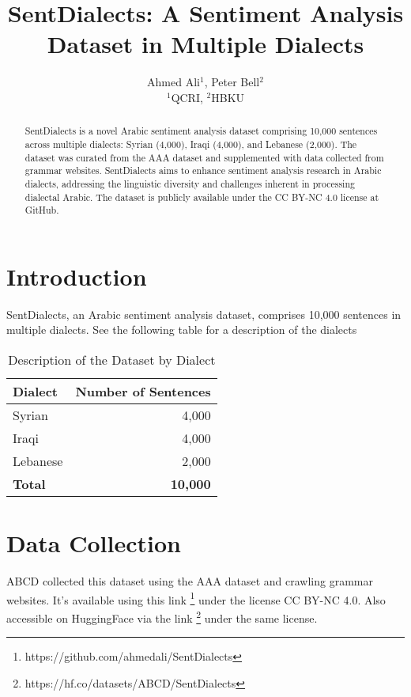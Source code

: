 \documentclass{article}
\title{SentDialects: A Sentiment Analysis Dataset in Multiple Dialects}
\author{
    Ahmed Ali$^{1}$, Peter Bell$^{2}$ \\
    $^{1}$QCRI, $^{2}$HBKU
}
\begin{document}
\maketitle

\begin{abstract}
SentDialects is a novel Arabic sentiment analysis dataset comprising 10,000 sentences across multiple dialects: Syrian (4,000), Iraqi (4,000), and Lebanese (2,000). The dataset was curated from the AAA dataset and supplemented with data collected from grammar websites. SentDialects aims to enhance sentiment analysis research in Arabic dialects, addressing the linguistic diversity and challenges inherent in processing dialectal Arabic. The dataset is publicly available under the CC BY-NC 4.0 license at GitHub.
\end{abstract}

\section{Introduction}

SentDialects, an Arabic sentiment analysis dataset, comprises 10,000 sentences in multiple dialects. See the following table for 
a description of the dialects

\begin{table}[ht]
    \centering
    \begin{tabular}{l|r}
    \hline
    \textbf{Dialect}   & \textbf{Number of Sentences} \\
    \hline
    Syrian     & 4,000  \\
    Iraqi      & 4,000  \\
    Lebanese   & 2,000  \\
    \hline
    \textbf{Total} & \textbf{10,000} \\
    \hline
    \end{tabular}
    \caption{Description of the Dataset by Dialect}
    \label{tab:dataset_description}
    \end{table}

\section{Data Collection}
ABCD collected this dataset using the AAA dataset and crawling grammar websites. 
It’s available using this link \footnote{https://github.com/ahmedali/SentDialects} under the license CC BY-NC 4.0. 
Also accessible on HuggingFace via the link \footnote{https://hf.co/datasets/ABCD/SentDialects} under the same license.
\end{document}
